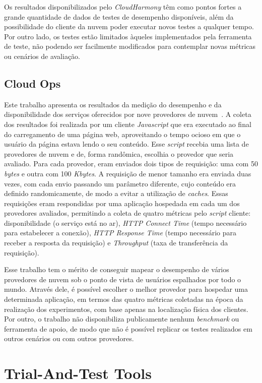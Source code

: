 Os resultados disponibilizados pelo {\em CloudHarmony} têm como pontos fortes a
grande quantidade de dados de testes de desempenho disponíveis, além da possibilidade do cliente da
nuvem poder executar novos testes a qualquer tempo. Por outro lado, os testes estão limitados àqueles implementados pela ferramenta de teste, não podendo ser facilmente modificados para contemplar novas métricas ou cenários de avaliação.

\subsection{Cloud Ops}
Este trabalho apresenta os resultados da medição do desempenho e da disponibilidade
dos serviços oferecidos por nove provedores de nuvem~\cite{cloudops}.  A coleta dos resultados foi realizada por um cliente {\em Javascript} que era executado ao final do carregamento de uma página web, aproveitando o tempo ocioso em que o usuário da página estava lendo o seu conteúdo. Esse {\em script} recebia uma
lista de provedores de nuvem e de, forma randômica, escolhia o provedor que seria
avaliado. Para cada provedor, eram enviados dois tipos de requisição: uma com 50
{\em bytes} e outra com 100 {\em Kbytes}. A requisição de menor tamanho era
enviada duas vezes, com cada envio passando um parâmetro diferente, cujo conteúdo era definido randomicamente, de modo a evitar a utilização de {\em caches}. Essas requisições
eram respondidas por uma aplicação hospedada em cada um dos provedores avaliados, permitindo a coleta de quatro métricas pelo {\em script} cliente: disponibilidade (o serviço está no ar), {\em HTTP Connect
Time} (tempo necessário para estabelecer a conexão), {\em HTTP Response Time} (tempo
necessário para receber a resposta da requisição) e {\em Throughput} (taxa de
transferência da requisição).

Esse trabalho tem o mérito de conseguir mapear o desempenho de vários provedores de nuvem sob o ponto de
vista de usuários espalhados por todo o mundo. Através dele, é possível escolher o melhor provedor para hospedar uma determinada aplicação, em termos das quatro métricas coletadas na época da realização dos experimentos, com base apenas na localização física dos clientes. Por outro, o trabalho não disponibiliza publicamente nenhum {\em benchmark} ou ferramenta de apoio, de modo que não é possível replicar os testes realizados em outros cenários ou com outros provedores. 

\section{Trial-And-Test Tools}
